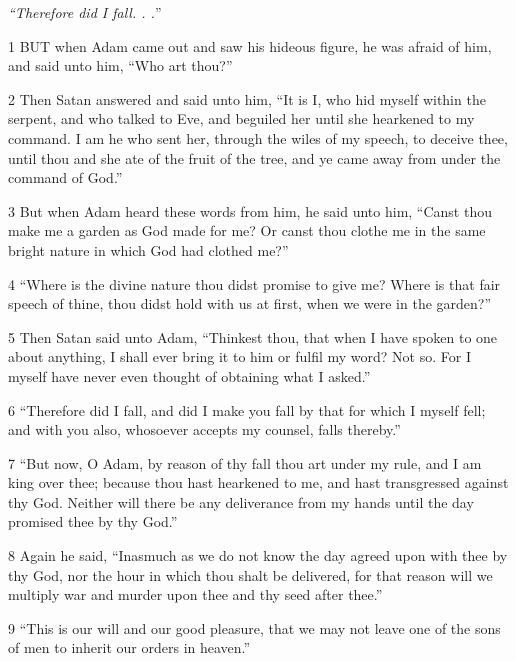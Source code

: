 \par \textit{“Therefore did I fall. . .}”

\par 1 BUT when Adam came out and saw his hideous figure, he was afraid of him, and said unto him, “Who art thou?”

\par 2 Then Satan answered and said unto him, “It is I, who hid myself within the serpent, and who talked to Eve, and beguiled her until she hearkened to my command. I am he who sent her, through the wiles of my speech, to deceive thee, until thou and she ate of the fruit of the tree, and ye came away from under the command of God.”

\par 3 But when Adam heard these words from him, he said unto him, “Canst thou make me a garden as God made for me? Or canst thou clothe me in the same bright nature in which God had clothed me?”

\par 4 “Where is the divine nature thou didst promise to give me? Where is that fair speech of thine, thou didst hold with us at first, when we were in the garden?”

\par 5 Then Satan said unto Adam, “Thinkest thou, that when I have spoken to one about anything, I shall ever bring it to him or fulfil my word? Not so. For I myself have never even thought of obtaining what I asked.”

\par 6 “Therefore did I fall, and did I make you fall by that for which I myself fell; and with you also, whosoever accepts my counsel, falls thereby.”

\par 7 “But now, O Adam, by reason of thy fall thou art under my rule, and I am king over thee; because thou hast hearkened to me, and hast transgressed against thy God. Neither will there be any deliverance from my hands until the day promised thee by thy God.”

\par 8 Again he said, “Inasmuch as we do not know the day agreed upon with thee by thy God, nor the hour in which thou shalt be delivered, for that reason will we multiply war and murder upon thee and thy seed after thee.”

\par 9 “This is our will and our good pleasure, that we may not leave one of the sons of men to inherit our orders in heaven.”

